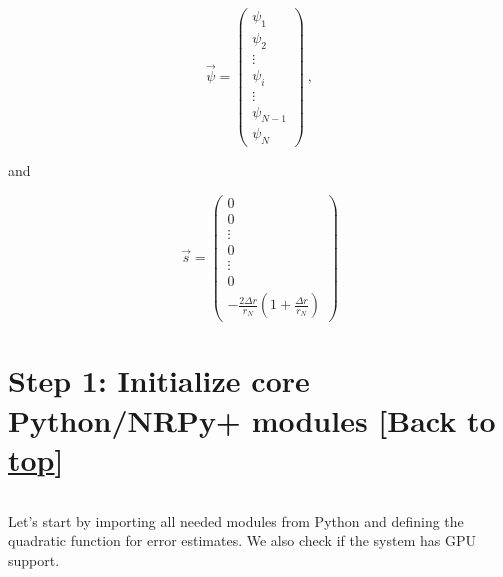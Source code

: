 \documentclass[landscape,letterpaper,10pt,english]{article}
\begin{document}
\[
\vec{\psi} = 
\begin{pmatrix}
\psi_{1}\\
\psi_{2}\\
\vdots\\
\psi_{i}\\
\vdots\\
\psi_{N-1}\\
\psi_{N}
\end{pmatrix}\ ,
\]

and

\[
\vec{s} = 
\begin{pmatrix}
0\\
0\\
\vdots\\
0\\
\vdots\\
0\\
-\frac{2\Delta r}{r_{N}}\left(1+\frac{\Delta r}{r_{N}}\right)
\end{pmatrix}
\]

    \hypertarget{step-1-initialize-core-pythonnrpy-modules-back-to-top}{%
\section{\texorpdfstring{Step 1: Initialize core Python/NRPy+ modules
{[}Back to
\hyperref[toc]{top}{]}}{Step 1: Initialize core Python/NRPy+ modules {[}Back to {]}}}\label{step-1-initialize-core-pythonnrpy-modules-back-to-top}}

\[\label{initialize_nrpy}\]

Let's start by importing all needed modules from Python and defining the
quadratic function for error estimates. We also check if the system has
GPU support.
\end{document}
